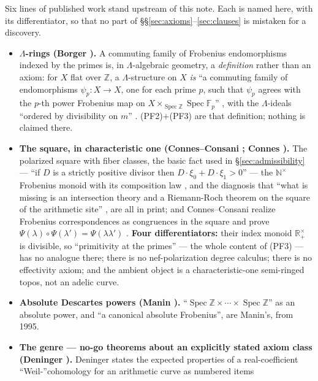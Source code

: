 \documentclass[11pt]{article}
\theoremstyle{plain}
\theoremstyle{definition}
\theoremstyle{remark}
\begin{document}
Six lines of published work stand upstream of this note. Each is named here, with
its differentiator, so that no part of \S\S\ref{sec:axioms}--\ref{sec:clauses} is
mistaken for a discovery.

\begin{itemize}
\item \textbf{$\Lambda$-rings (Borger \cite{Borger}).} A commuting family of
Frobenius endomorphisms indexed by the primes is, in $\Lambda$-algebraic geometry,
a \emph{definition} rather than an axiom: for $X$ flat over $\mathbb{Z}$, a
$\Lambda$-structure on $X$ \emph{is} ``a commuting family of endomorphisms
$\psi_p : X \to X$, one for each prime $p$, such that $\psi_p$ agrees with the
$p$-th power Frobenius map on $X \times_{\operatorname{Spec}\mathbb{Z}}
\operatorname{Spec}\mathbb{F}_p$'' \cite[\S1.1]{Borger}, with the
$\Lambda$-ideals ``ordered by divisibility on $m$'' \cite[\S6]{Borger}.
(PF2)$+$(PF3) are that definition; nothing is claimed there.
\item \textbf{The square, in characteristic one (Connes--Consani \cite{CC16};
Connes \cite{CE15}).} The polarized square with fiber classes, the basic fact
used in \S\ref{sec:admissibility} --- ``if $D$ is a strictly positive divisor then
$D \cdot \xi_0 + D \cdot \xi_1 > 0$'' \cite[\S2.3]{CE15} --- the
$\mathbb{N}^\times$ Frobenius monoid with its composition law
\cite[\S4.3.1]{CE15}, and the diagnosis that ``what is missing is an intersection
theory and a Riemann-Roch theorem on the square of the arithmetic site''
\cite[\S4.3.2]{CE15}, are all in print; and Connes--Consani realize Frobenius
correspondences as congruences in the square and prove
$\Psi(\lambda) \circ \Psi(\lambda') = \Psi(\lambda\lambda')$
\cite[Thm.~1.2, Thm.~7.7]{CC16}. \textbf{Four differentiators:} their index monoid
$\mathbb{R}^\times_+$ is divisible, so ``primitivity at the primes'' --- the whole
content of (PF3) --- has no analogue there; there is no nef-polarization degree
calculus; there is no effectivity axiom; and the ambient object is a
characteristic-one semi-ringed topos, not an adelic curve.
\item \textbf{Absolute Descartes powers (Manin \cite{Manin}).}
``$\operatorname{Spec}\mathbb{Z} \times \cdots \times \operatorname{Spec}
\mathbb{Z}$'' as an absolute power, and ``a canonical absolute Frobenius'', are
Manin's, from 1995.
\item \textbf{The genre --- no-go theorems about an explicitly stated axiom class
(Deninger \cite{Den22}).} Deninger states the expected properties of a
real-coefficient ``Weil-''cohomology for an arithmetic curve as numbered items

\end{itemize}
\end{document}
